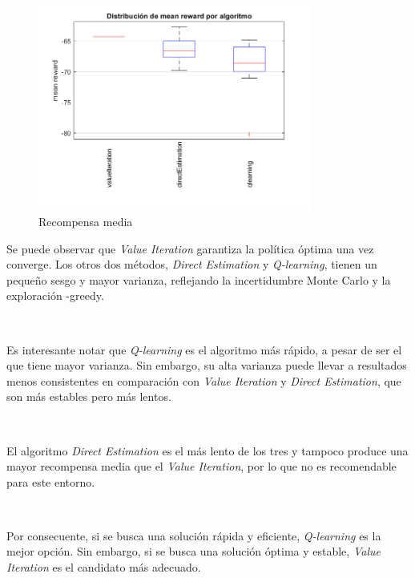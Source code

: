 \begin{figure}[H]
    \centering
    \includegraphics[width=0.8\textwidth]{../../experiments/algorithmsComparison/experiment/results/reward.png}
    \caption{Recompensa media}
    \label{fig:algorithmsComparison-reward}
\end{figure}

Se puede observar que \textit{Value Iteration} garantiza la política óptima una vez converge. Los otros dos métodos, \textit{Direct Estimation} y \textit{Q-learning}, tienen un pequeño sesgo y mayor varianza, reflejando la incertidumbre Monte Carlo y la exploración \epsilon-greedy.

\

Es interesante notar que \textit{Q-learning} es el algoritmo más rápido, a pesar de ser el que tiene mayor varianza. Sin embargo, su alta varianza puede llevar a resultados menos consistentes en comparación con \textit{Value Iteration} y \textit{Direct Estimation}, que son más estables pero más lentos.

\

El algoritmo \textit{Direct Estimation} es el más lento de los tres y tampoco produce una mayor recompensa media que el \textit{Value Iteration}, por lo que no es recomendable para este entorno.

\

Por consecuente, si se busca una solución rápida y eficiente, \textit{Q-learning} es la mejor opción. Sin embargo, si se busca una solución óptima y estable, \textit{Value Iteration} es el candidato más adecuado.